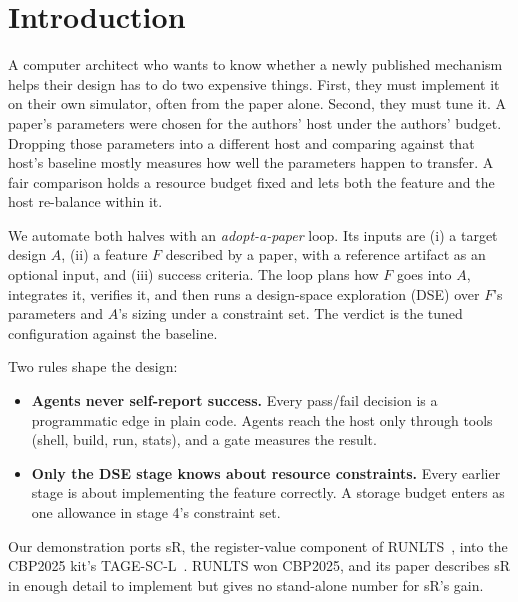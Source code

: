 \documentclass[conference]{IEEEtran}
\begin{document}
\section{Introduction}

A computer architect who wants to know whether a newly published mechanism
helps their design has to do two expensive things. First, they must implement
it on their own simulator, often from the paper alone. Second, they must tune
it. A paper's parameters were chosen for the authors' host under the authors'
budget. Dropping those parameters into a different host and comparing against
that host's baseline mostly measures how well the parameters happen to
transfer. A fair comparison holds a resource budget fixed and lets both the
feature and the host re-balance within it.

We automate both halves with an \emph{adopt-a-paper} loop. Its inputs are (i) a
target design $A$, (ii) a feature $F$ described by a paper, with a reference
artifact as an optional input, and (iii) success criteria. The loop plans how
$F$ goes into $A$, integrates it, verifies it, and then runs a design-space
exploration (DSE) over $F$'s parameters and $A$'s sizing under a constraint
set. The verdict is the tuned configuration against the baseline.

Two rules shape the design:
\begin{itemize}
\item \textbf{Agents never self-report success.} Every pass/fail decision is a
programmatic edge in plain code. Agents reach the host only through tools
(shell, build, run, stats), and a gate measures the result.
\item \textbf{Only the DSE stage knows about resource constraints.} Every
earlier stage is about implementing the feature correctly. A storage budget
enters as one allowance in stage 4's constraint set.
\end{itemize}

Our demonstration ports sR, the register-value component of RUNLTS~\cite{runlts},
into the CBP2025 kit's TAGE-SC-L~\cite{cbp2025kit,tagescl}. RUNLTS won CBP2025,
and its paper describes sR in enough detail to implement but gives no
stand-alone number for sR's gain.
\end{document}
